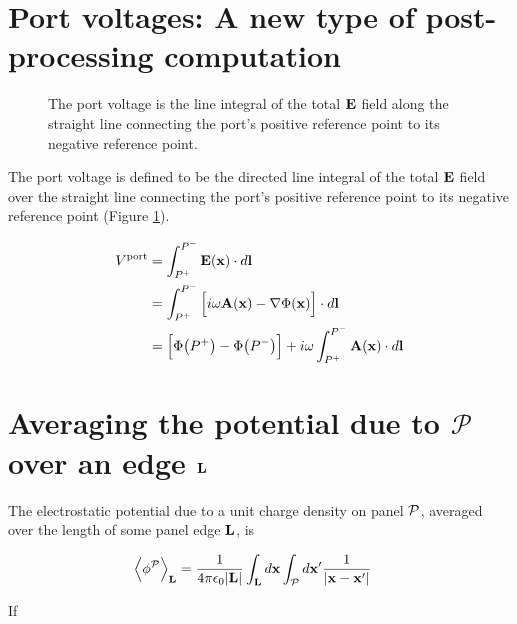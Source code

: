 \documentclass[letterpaper]{article}
\begin{document}
\newpage
\section{Port voltages: A new type of post-processing computation}
\begin{figure}
\begin{center}
\caption{The port voltage is the line integral of the total $\mathbf{E}$ 
         field along the straight line connecting the port's 
         positive reference point to its negative reference point.
        }
\label{LineIntegralFigure}
\end{center}
\end{figure}

\label{PortVoltageSection}

The port voltage is defined to be the directed line integral 
of the total $\mathbf{E}$ field over the straight line connecting
the port's positive reference point to its negative reference
point (Figure \ref{LineIntegralFigure}).

\begin{align*}
  V^{\hbox{\scriptsize{port}}}
&=\int_{P^+}^{P^-} \mathbf{E}(\mathbf{x}) \cdot d \mathbf{l} 
\\
&=\int_{P^+}^{P^-} \Big[ i\omega \mathbf{A}(\mathbf{x}) - \nabla \Phi(\mathbf{x})\Big]
                   \cdot d \mathbf{l}
\\
&= \Big[ \Phi\big(P^+\big) - \Phi\big(P^-\big)\Big]
   +i\omega \int_{P^+}^{P^-} \mathbf{A}(\mathbf{x}) \cdot d\mathbf{l}
\end{align*}

\section*{Averaging the potential due to $\mathcal{P}$ over an edge $\mathbf{L}$}

The electrostatic potential due to a unit charge density on panel $\mathcal{P}$,
averaged over the length of some panel edge $\mathbf{L}$, is 

\begin{align*}
 \Big\langle \phi^{\mathcal{P}} \Big \rangle_{\mathbf{L}}
&= \frac{1}{4\pi \epsilon_0 |\mathbf{L}|}\int_{\mathbf{L}} d\mathbf{x} \int_{\mathcal{P}} d\mathbf{x}^\prime 
   \frac{1}{|\mathbf{x} - \mathbf{x}^\prime|} 
\end{align*}

If 
\end{document}
